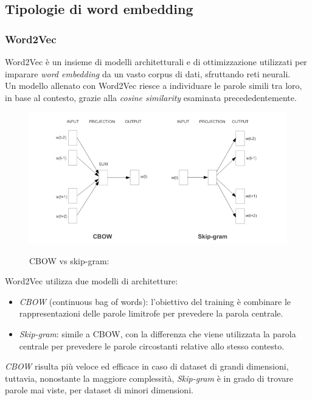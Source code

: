 \subsection{Tipologie di word embedding}

\subsubsection{Word2Vec}

Word2Vec è un insieme di modelli architetturali e di ottimizzazione utilizzati per imparare \emph{word embedding} da un vasto corpus di dati, sfruttando reti neurali.
\\
Un modello allenato con Word2Vec riesce a individuare le parole simili tra loro, in base al contesto, grazie alla \textit{cosine similarity} esaminata precededentemente.

\begin{figure}[h]
    \centering
    \includegraphics[width=14cm]{./immagini/cbow_vs_skipgram.png}
    \label{cbowskipgram}
    \caption{CBOW vs skip-gram:}
\end{figure}
\newpage
Word2Vec utilizza due modelli di architetture:
\begin{itemize}
    \item \emph{CBOW} (continuous bag of words): l'obiettivo del training è combinare le rappresentazioni delle parole limitrofe per prevedere la parola centrale.
    \item \emph{Skip-gram}: simile a CBOW, con la differenza che viene utilizzata la parola centrale per prevedere le parole circostanti relative allo stesso contesto.
\end{itemize}

\emph{CBOW} risulta più veloce ed efficace in caso di dataset di grandi dimensioni, tuttavia, nonostante la maggiore complessità, \emph{Skip-gram} è in grado di trovare parole mai viste, per dataset di minori dimensioni. \cite{mikolov2013efficient}


